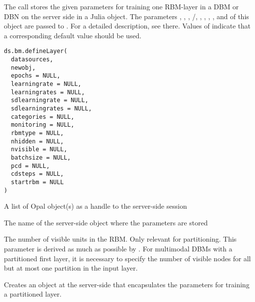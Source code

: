 %
\begin{Description}\relax
The call stores the given parameters for training one RBM-layer in a DBM or DBN
on the server side in a Julia  object.
The parameters , , ,
/, ,
, , ,  and 
of this object are passed to .
For a detailed description, see there.
Values of  indicate that a corresponding default value should be used.
\end{Description}
%
\begin{Usage}
\begin{verbatim}
ds.bm.defineLayer(
  datasources,
  newobj,
  epochs = NULL,
  learningrate = NULL,
  learningrates = NULL,
  sdlearningrate = NULL,
  sdlearningrates = NULL,
  categories = NULL,
  monitoring = NULL,
  rbmtype = NULL,
  nhidden = NULL,
  nvisible = NULL,
  batchsize = NULL,
  pcd = NULL,
  cdsteps = NULL,
  startrbm = NULL
)
\end{verbatim}
\end{Usage}
%
\begin{Arguments}
\begin{ldescription}
\item[\code{datasources}] A list of Opal object(s) as a handle to the server-side session

\item[\code{newobj}] The name of the server-side object where the parameters are stored

\item[\code{nvisible}] The number of visible units in the RBM. Only relevant for partitioning.
This parameter is derived as much as possible by .
For multimodal DBMs with a partitioned first layer, it is necessary to specify
the number of visible nodes for all but at most one partition in the input layer.
\end{ldescription}
\end{Arguments}
%
\begin{Description}\relax
Creates an object at the server-side that encapsulates the parameters for training
a partitioned layer.
\end{Description}
